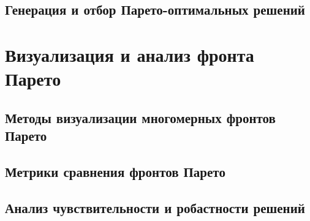 \subsection{Генерация и отбор Парето-оптимальных решений}\label{sec:ch4/sec4/subsec3}

\section{Визуализация и анализ фронта Парето}\label{sec:ch4/sec5}
\subsection{Методы визуализации многомерных фронтов Парето}\label{sec:ch4/sec5/subsec1}
\subsection{Метрики сравнения фронтов Парето}\label{sec:ch4/sec5/subsec2}
\subsection{Анализ чувствительности и робастности решений}\label{sec:ch4/sec5/subsec3}

